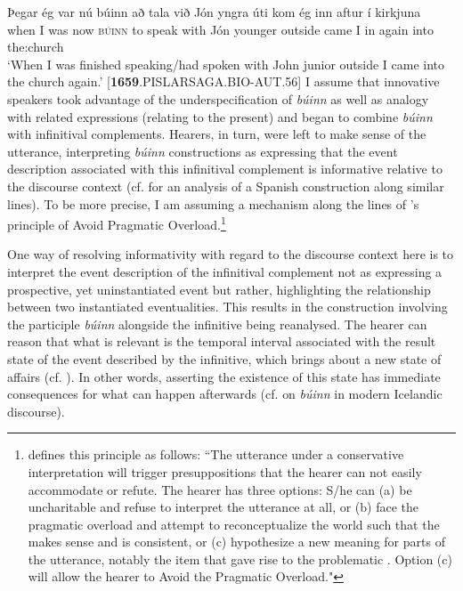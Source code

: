 \documentclass[output=paper,colorlinks,citecolor=brown]{langscibook}
\begin{document}
\ea \label{ex: tempant1} \gll Þegar ég var nú búinn að tala við Jón yngra úti kom ég inn aftur í kirkjuna\\
when I was now \textsc{búinn} to speak with Jón younger outside came I in again into the:church\\
\glt `When I was finished speaking/had spoken with John junior outside I came into the church again.'  \hfill [\textbf{1659}.PISLARSAGA.BIO-AUT.56]
\z
\largerpage[-1]
I assume that innovative speakers took advantage of the underspecification of \textit{búinn} as well as analogy with related expressions (relating to the present) and began to combine \textit{búinn} with infinitival complements. Hearers, in turn, were left to make sense of the utterance, interpreting  \textit{búinn} constructions as expressing that the event description associated with this infinitival complement is informative relative to the discourse context (cf. \citeauthor{rosemeyer2017road} \citeyear{rosemeyer2017road} for an analysis of a Spanish construction along similar lines). To be more precise, I am assuming a mechanism along the lines of \citet{eckardt2009apo}'s principle of Avoid Pragmatic Overload.\footnote{\citet[14]{eckardt2009apo} defines this principle as follows: ``The utterance under a conservative interpretation will trigger presuppositions that the hearer can not easily accommodate or refute. The hearer has three options: S/he can (a) be uncharitable and refuse to interpret the utterance at all, or (b) face the pragmatic overload and attempt to reconceptualize the world such that the  makes sense and is consistent, or (c) hypothesize a new meaning for parts of the utterance, notably the item that gave rise to the problematic . Option (c) will allow the hearer to Avoid the Pragmatic Overload."}

One way of resolving informativity with regard to the discourse context here is to interpret the event description of the infinitival complement not as expressing a prospective, yet uninstantiated event but rather, highlighting the relationship between two instantiated eventualities. This results in the construction involving the participle \textit{búinn} alongside the infinitive being reanalysed. The hearer can reason that what is relevant is the temporal interval associated with the result state of the event described by the infinitive, which brings about a new state of affairs (cf. \citeauthor{rosemeyer2017road} \citeyear{rosemeyer2017road}). In other words, asserting the existence of this state has immediate consequences for what can happen afterwards (cf. \citeauthor{wide2002perfect} \citeyear{wide2002perfect} on \textit{búinn} in modern Icelandic discourse).
\end{document}

